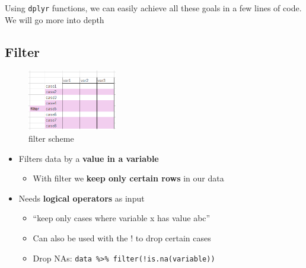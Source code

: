 \documentclass[
]{book}
\newenvironment{Shaded}{\begin{snugshade}}{\end{snugshade}}
\newcommand{\AttributeTok}[1]{\textcolor[rgb]{0.13,0.29,0.53}{#1}}
\newcommand{\CommentTok}[1]{\textcolor[rgb]{0.56,0.35,0.01}{\textit{#1}}}
\newcommand{\FunctionTok}[1]{\textcolor[rgb]{0.13,0.29,0.53}{\textbf{#1}}}
\newcommand{\NormalTok}[1]{#1}
\newcommand{\OtherTok}[1]{\textcolor[rgb]{0.56,0.35,0.01}{#1}}
\newcommand{\SpecialCharTok}[1]{\textcolor[rgb]{0.81,0.36,0.00}{\textbf{#1}}}
\newcommand{\StringTok}[1]{\textcolor[rgb]{0.31,0.60,0.02}{#1}}
\providecommand{\tightlist}{%
  \setlength{\itemsep}{0pt}\setlength{\parskip}{0pt}}
\begin{document}
Using \texttt{dplyr} functions, we can easily achieve all these goals in a few lines of code.
We will go more into depth

\begin{Shaded}
\end{Shaded}

\subsection{Filter}\label{filter}

\begin{figure}
\centering
\includegraphics[width=\textwidth,height=1.04167in]{./img/filter.png}
\caption{filter scheme}
\end{figure}

\begin{itemize}
\tightlist
\item
  Filters data by a \textbf{value in a variable}

  \begin{itemize}
  \tightlist
  \item
    With filter we \textbf{keep only certain rows} in our data
  \end{itemize}
\item
  Needs \textbf{logical operators} as input

  \begin{itemize}
  \tightlist
  \item
    ``keep only cases where variable x has value abc''
  \item
    Can also be used with the ! to drop certain cases
  \item
    Drop NAs: \texttt{data\ \%\textgreater{}\%\ filter(!is.na(variable))}
  \end{itemize}
\end{itemize}
\end{document}
